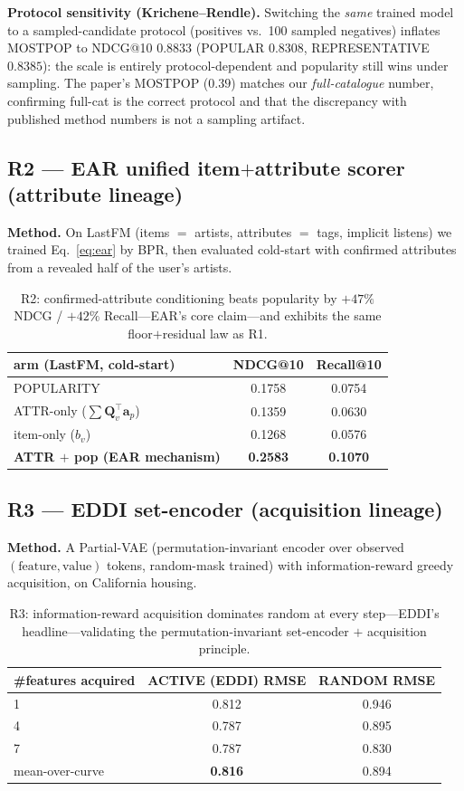 \documentclass[11pt]{article}
\newcommand{\Q}{\mathbf{Q}}
\begin{document}
\textbf{Protocol sensitivity (Krichene--Rendle).} Switching the \emph{same} trained model to a sampled-candidate
protocol (positives vs.\ 100 sampled negatives) inflates MOSTPOP to NDCG@10 $0.8833$ (POPULAR $0.8308$,
REPRESENTATIVE $0.8385$): the scale is entirely protocol-dependent and popularity still wins under sampling. The
paper's MOSTPOP ($0.39$) matches our \emph{full-catalogue} number, confirming full-cat is the correct protocol and
that the discrepancy with published method numbers is not a sampling artifact.

\subsection{R2 --- EAR unified item$+$attribute scorer (attribute lineage)}
\textbf{Method.} On LastFM (items $=$ artists, attributes $=$ tags, implicit listens) we trained Eq.~\eqref{eq:ear}
by BPR, then evaluated cold-start with confirmed attributes from a revealed half of the user's artists.

\begin{table}[h]\centering\small
\begin{tabular}{lcc}
\toprule
arm (LastFM, cold-start) & NDCG@10 & Recall@10\\
\midrule
POPULARITY & 0.1758 & 0.0754\\
ATTR-only ($\sum \Q_v^\top\mathbf{a}_p$) & 0.1359 & 0.0630\\
item-only ($b_v$) & 0.1268 & 0.0576\\
\textbf{ATTR $+$ pop (EAR mechanism)} & \textbf{0.2583} & \textbf{0.1070}\\
\bottomrule
\end{tabular}
\caption{R2: confirmed-attribute conditioning beats popularity by $+47\%$ NDCG / $+42\%$ Recall---EAR's core
claim---and exhibits the same floor$+$residual law as R1.}
\label{tab:r2}
\end{table}

\subsection{R3 --- EDDI set-encoder (acquisition lineage)}
\textbf{Method.} A Partial-VAE (permutation-invariant encoder over observed $(\text{feature},\text{value})$
tokens, random-mask trained) with information-reward greedy acquisition, on California housing.

\begin{table}[h]\centering\small
\begin{tabular}{lcc}
\toprule
\#features acquired & ACTIVE (EDDI) RMSE & RANDOM RMSE\\
\midrule
1 & 0.812 & 0.946\\
4 & 0.787 & 0.895\\
7 & 0.787 & 0.830\\
mean-over-curve & \textbf{0.816} & 0.894\\
\bottomrule
\end{tabular}
\caption{R3: information-reward acquisition dominates random at every step---EDDI's headline---validating the
permutation-invariant set-encoder $+$ acquisition principle.}
\label{tab:r3}
\end{table}
\end{document}
